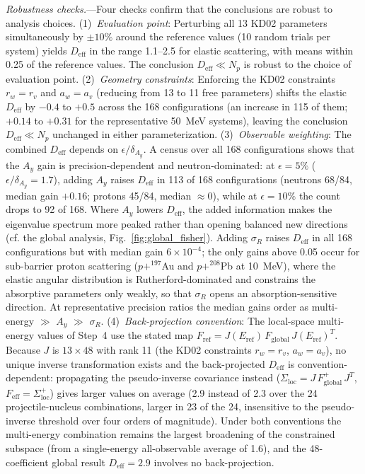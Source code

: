 \documentclass[aps,prl,reprint,superscriptaddress,showpacs,floatfix]{revtex4-2}
\begin{document}
\textit{Robustness checks.}---Four checks confirm that the conclusions are robust to analysis choices. (1)~\emph{Evaluation point}: Perturbing all 13 KD02 parameters simultaneously by $\pm 10\%$ around the reference values (10 random trials per system) yields $D_\mathrm{eff}$ in the range 1.1--2.5 for elastic scattering, with means within 0.25 of the reference values. The conclusion $D_\mathrm{eff} \ll N_p$ is robust to the choice of evaluation point. (2)~\emph{Geometry constraints}: Enforcing the KD02 constraints $r_w = r_v$ and $a_w = a_v$ (reducing from 13 to 11 free parameters) shifts the elastic $D_\mathrm{eff}$ by $-0.4$ to $+0.5$ across the 168 configurations (an increase in 115 of them; $+0.14$ to $+0.31$ for the representative 50~MeV systems), leaving the conclusion $D_\mathrm{eff} \ll N_p$ unchanged in either parameterization. (3)~\emph{Observable weighting}: The combined $D_\mathrm{eff}$ depends on $\epsilon / \delta_{A_y}$. A census over all 168 configurations shows that the $A_y$ gain is precision-dependent and neutron-dominated: at $\epsilon = 5\%$ ($\epsilon/\delta_{A_y} = 1.7$), adding $A_y$ raises $D_\mathrm{eff}$ in 113 of 168 configurations (neutrons 68/84, median gain $+0.16$; protons 45/84, median $\approx 0$), while at $\epsilon = 10\%$ the count drops to 92 of 168. Where $A_y$ lowers $D_\mathrm{eff}$, the added information makes the eigenvalue spectrum more peaked rather than opening balanced new directions (cf. the global analysis, Fig.~\ref{fig:global_fisher}). Adding $\sigma_R$ raises $D_\mathrm{eff}$ in all 168 configurations but with median gain $6\times10^{-4}$; the only gains above 0.05 occur for sub-barrier proton scattering ($p+^{197}$Au and $p+^{208}$Pb at 10~MeV), where the elastic angular distribution is Rutherford-dominated and constrains the absorptive parameters only weakly, so that $\sigma_R$ opens an absorption-sensitive direction. At representative precision ratios the median gains order as multi-energy $\gg$ $A_y$ $\gg$ $\sigma_R$. (4)~\emph{Back-projection convention}: The local-space multi-energy values of Step~4 use the stated map $F_\mathrm{ref} = J(E_\mathrm{ref})\,F_\mathrm{global}\,J(E_\mathrm{ref})^T$. Because $J$ is $13 \times 48$ with rank 11 (the KD02 constraints $r_w = r_v$, $a_w = a_v$), no unique inverse transformation exists and the back-projected $D_\mathrm{eff}$ is convention-dependent: propagating the pseudo-inverse covariance instead ($\Sigma_\mathrm{loc} = J\,F_\mathrm{global}^{+}\,J^{T}$, $F_\mathrm{eff} = \Sigma_\mathrm{loc}^{+}$) gives larger values on average (2.9 instead of 2.3 over the 24 projectile-nucleus combinations, larger in 23 of the 24, insensitive to the pseudo-inverse threshold over four orders of magnitude). Under both conventions the multi-energy combination remains the largest broadening of the constrained subspace (from a single-energy all-observable average of 1.6), and the 48-coefficient global result $D_\mathrm{eff} = 2.9$ involves no back-projection.
\end{document}
